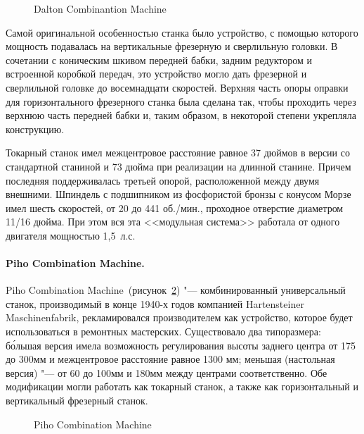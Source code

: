\begin{figure}[ht]
	\caption{Dalton Combinantion Machine}\label{fig:dalton}
\end{figure}

Самой оригинальной особенностью станка было устройство, с помощью которого мощность подавалась на вертикальные фрезерную и сверлильную головки. В сочетании с коническим шкивом передней бабки, задним редуктором и встроенной коробкой передач, это устройство могло дать фрезерной и сверлильной головке до восемнадцати скоростей. Верхняя часть опоры оправки для горизонтального фрезерного станка была сделана так, чтобы проходить через верхнюю часть передней бабки и, таким образом, в некоторой степени укрепляла конструкцию.

Токарный станок имел межцентровое расстояние равное 37 дюймов в версии со стандартной станиной и 73 дюйма при реализации на длинной станине. Причем последняя поддерживалась третьей опорой, расположенной между двумя внешними. Шпиндель с подшипником из фосфористой бронзы с конусом Морзе имел шесть скоростей, от 20 до 441 об./мин., проходное отверстие диаметром 11/16 дюйма. При этом вся эта <<модульная система>> работала от одного двигателя мощностью 1,5~л.\:с.

\paragraph{Piho Combination Machine.}

Piho Combination Machine~(рисунок~\cref{fig:piho}) "--- комбинированный универсальный станок, производимый в конце 1940-х годов компанией Hartensteiner Maschinenfabrik, рекламировался производителем как устройство, которое будет использоваться в ремонтных мастерских. Существовало два типоразмера: б\'ольшая версия имела возможность регулирования высоты заднего центра от 175 до 300\:мм и межцентровое расстояние равное 1300 мм; меньшая (настольная версия) "--- от 60 до 100\:мм и 180\:мм между центрами соответственно. Обе модификации могли работать как токарный станок, а также как горизонтальный и вертикальный фрезерный станок.

\begin{figure}[ht]
	\caption{Piho Combination Machine}\label{fig:piho}
\end{figure}

